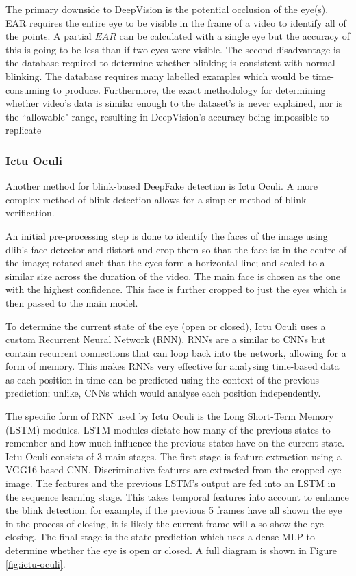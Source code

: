 The primary downside to DeepVision is the potential occlusion of the eye(s). EAR requires the entire eye to be visible in the frame of a video to identify all of the points. A partial $EAR$ can be calculated with a single eye but the accuracy of this is going to be less than if two eyes were visible. The second disadvantage is the database required to determine whether blinking is consistent with normal blinking. The database requires many labelled examples which would be time-consuming to produce. Furthermore, the exact methodology for determining whether video's data is similar enough to the dataset's is never explained, nor is the ``allowable" range, resulting in DeepVision's accuracy being impossible to replicate

\subsubsection{Ictu Oculi}

Another method for blink-based DeepFake detection is Ictu Oculi\cite{li2018ictu}. A more complex method of blink-detection allows for a simpler method of blink verification. 

An initial pre-processing step is done to identify the faces of the image using dlib's\cite{king2009dlib} face detector and distort and crop them so that the face is: in the centre of the image; rotated such that the eyes form a horizontal line; and scaled to a similar size across the duration of the video. The main face is chosen as the one with the highest confidence. This face is further cropped to just the eyes which is then passed to the main model.

To determine the current state of the eye (open or closed), Ictu Oculi uses a custom Recurrent Neural Network (RNN). RNNs are a similar to CNNs but contain recurrent connections that can loop back into the network, allowing for a form of memory. This makes RNNs very effective for analysing time-based data as each position in time can be predicted using the context of the previous prediction; unlike, CNNs which would analyse each position independently.

The specific form of RNN used by Ictu Oculi is the Long Short-Term Memory (LSTM) modules\cite{hochreiter1997long}. LSTM modules dictate how many of the previous states to remember and how much influence the previous states have on the current state. Ictu Oculi consists of 3 main stages. The first stage is feature extraction using a VGG16-based CNN. Discriminative features are extracted from the cropped eye image. The features and the previous LSTM's output are fed into an LSTM in the sequence learning stage. This takes temporal features into account to enhance the blink detection; for example, if the previous 5 frames have all shown the eye in the process of closing, it is likely the current frame will also show the eye closing. The final stage is the state prediction which uses a dense MLP to determine whether the eye is open or closed. A full diagram is shown in Figure \ref{fig:ictu-oculi}.

